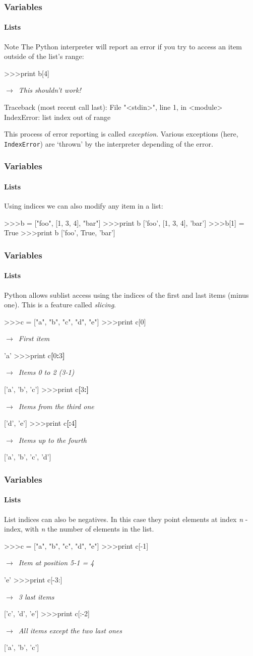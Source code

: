 \documentclass[handout]{beamer}
\def\prompt{>\hspace{-1pt}>\hspace{-1pt}>\/}
\newcommand{\comment}[1]{{\raggedright $\rightarrow$~\textit{\textsf{#1}}}}
\begin{document}
\begin{frame}[fragile]
	\frametitle{Variables}
	\framesubtitle{Lists}
	\begin{block}{Note}
	The Python interpreter will report an error if you try to access an item outside of the list's range:

	\begin{semiverbatim}
		\prompt print b[4]	\comment{This shouldn't work!}
		Traceback (most recent call last):
		  File "<stdin>", line 1, in <module>
		IndexError: list index out of range
	\end{semiverbatim}

	This process of error reporting is called \textit{exception}. Various exceptions (here, \texttt{IndexError}) are `thrown' by the interpreter depending of the error.
	\end{block}
\end{frame}

\begin{frame}[fragile]
	\frametitle{Variables}
	\framesubtitle{Lists}

	Using indices we can also modify any item in a list:

	\begin{semiverbatim}
		\prompt b = ["foo", [1, 3, 4], "bar"]
		\prompt print b
		['foo', [1, 3, 4], 'bar']
		\prompt b[1] = True
		\prompt print b
		['foo', True, 'bar']
	\end{semiverbatim}
\end{frame}

\begin{frame}[fragile]
	\frametitle{Variables}
	\framesubtitle{Lists}

	Python allows sublist access using the indices of the first and last items (minus one). This is a feature called \textit{slicing}.

	\begin{semiverbatim}
		\prompt c = ["a", "b", "c", "d", "e"]
		\prompt print c[0]	\comment{First item}
		'a'
		\prompt print c\textbf{[}0\textbf{:}3\textbf{]}	\comment{Items 0 to 2 (3-1)}
		['a', 'b', 'c']
		\prompt print c\textbf{[}3\textbf{:]}	\comment{Items from the third one}
		['d', 'e']
		\prompt print c\textbf{[:}4\textbf{]}	\comment{Items up to the fourth}
		['a', 'b', 'c', 'd']
	\end{semiverbatim}
\end{frame}

\begin{frame}[fragile]
	\frametitle{Variables}
	\framesubtitle{Lists}

	List indices can also be negatives. In this case they point elements at index \textit{n} - index, with \textit{n} the number of elements in the list.

	\begin{semiverbatim}
		\prompt c = ["a", "b", "c", "d", "e"]
		\prompt print c[-1]	\comment{Item at position 5-1 = 4}
		'e'
		\prompt print c[-3:]	\comment{3 last items}
		['c', 'd', 'e']
		\prompt print c[:-2]	\comment{All items except the two last ones}
		['a', 'b', 'c']
	\end{semiverbatim}
\end{frame}
\end{document}
